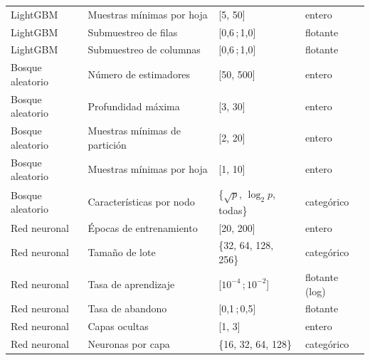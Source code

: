 \begin{table}[H]
\begin{tabular}{llll}
        LightGBM & Muestras mínimas por hoja   & {[}5, 50{]}               & entero \\
        LightGBM & Submuestreo de filas        & {[}0,6\,;\,1,0{]}         & flotante \\
        LightGBM & Submuestreo de columnas     & {[}0,6\,;\,1,0{]}         & flotante \\
        \hline
        Bosque aleatorio & Número de estimadores      & {[}50, 500{]}     & entero \\
        Bosque aleatorio & Profundidad máxima         & {[}3, 30{]}       & entero \\
        Bosque aleatorio & Muestras mínimas de partición & {[}2, 20{]}    & entero \\
        Bosque aleatorio & Muestras mínimas por hoja  & {[}1, 10{]}       & entero \\
        Bosque aleatorio & Características por nodo   & \{$\sqrt{p}$, $\log_2 p$, todas\} & categórico \\
        \hline
        Red neuronal & Épocas de entrenamiento    & {[}20, 200{]}             & entero \\
        Red neuronal & Tamaño de lote             & \{32, 64, 128, 256\}      & categórico \\
        Red neuronal & Tasa de aprendizaje        & {[}$10^{-4}$\,;\,$10^{-2}${]} & flotante (log) \\
        Red neuronal & Tasa de abandono           & {[}0,1\,;\,0,5{]}         & flotante \\
        Red neuronal & Capas ocultas              & {[}1, 3{]}                & entero \\
        Red neuronal & Neuronas por capa          & \{16, 32, 64, 128\}       & categórico \\
        \hline
    \end{tabular}
\end{table}
